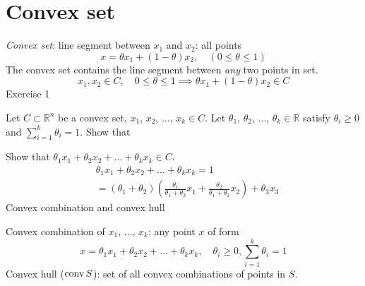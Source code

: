 \section{Convex set}
\textit{Convex set}: line segment between $x_1$ and $x_2$: all points
\[
    x = \theta x_1 + (1 - \theta) x_2, \quad (0 \leq \theta \leq 1)
\]
The convex set contains the line segment between \textit{any} two points in set.
\[
    x_1, x_2 \in C, \quad 0 \leq \theta \leq 1 \implies \theta x_1 + (1 - \theta) x_2 \in C
\]
Exercise 1

Let $C \subset \mathbb{R}^n$ be a convex set, $x_1$, $x_2$, $\dots$, $x_k \in C$. Let $\theta_1$, $\theta_2$, $\dots$, $\theta_k \in \mathbb{R}$ satisfy $\theta_i \geq 0$ and $\sum_{i=1}^k \theta_i = 1$. Show that

Show that $\theta_1 x_1 + \theta_2 x_2 + \dots + \theta_k x_k \in C$.
\begin{align*}
     & \theta_1 x_1 + \theta_2 x_2 + \dots + \theta_k x_k = 1                                                                                     \\
     & = (\theta_1 + \theta_2) \left( \frac{\theta_1}{\theta_1 + \theta _2} x_1 + \frac{\theta_2}{\theta_1 + \theta_2} x_2 \right) + \theta_3 x_3
\end{align*}
Convex combination and convex hull

Convex combination of $x_1$, $\dots$, $x_k$: any point $x$ of form
\[
    x = \theta_1 x_1 + \theta_2 x_2 + \dots + \theta_k x_k, \quad \theta_i \geq 0, \sum_{i=1}^k \theta_i = 1
\]
Convex hull ($\operatorname{conv}{S}$): set of all convex combinations of points in $S$.



